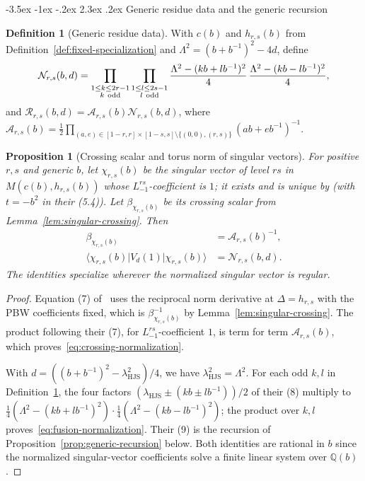 \documentclass[twoside,10pt]{article}
\makeatletter
\numberwithin{equation}{section}
\theoremstyle{slbody}
\newtheorem{proposition}[theorem]{Proposition}
\theoremstyle{definition}
\newtheorem{definition}[theorem]{Definition}
\theoremstyle{remark}
\renewcommand{\section}{%
  \@startsection{section}{1}{\z@}%
    {-3.5ex \@plus -1ex \@minus -.2ex}%
    {2.3ex \@plus .2ex}%
    {\normalfont\large\bfseries}}
\makeatother
\begin{document}
\section{Generic residue data and the generic recursion}\label{sec:generic-recursion}

\begin{definition}[Generic residue data]
\label{def:generic-residue}
With \(c(b)\) and \(h_{r,s}(b)\) from Definition~\ref{def:fixed-specialization}
and \(\Lambda^2=(b+b^{-1})^2-4d\), define
\[
 {\mathcal N}_{r,s}(b,d)
 =\prod_{\substack{1\leq k\leq2r-1\\k\ {\rm odd}}}
  \prod_{\substack{1\leq l\leq2s-1\\l\ {\rm odd}}}
 \frac{\Lambda^2-(kb+lb^{-1})^2}{4}\,
 \frac{\Lambda^2-(kb-lb^{-1})^2}{4},
\]
and \({\mathcal R}_{r,s}(b,d)={\mathcal A}_{r,s}(b){\mathcal N}_{r,s}(b,d)\),
where
\({\mathcal A}_{r,s}(b)=\frac12\prod_{(a,e)\in[1-r,r]\times[1-s,s]\setminus\{(0,0),(r,s)\}}(ab+eb^{-1})^{-1}\).
\end{definition}

\begin{proposition}[Crossing scalar and torus norm of singular vectors]
\label{prop:imported-normalizations}
For positive \(r,s\) and generic \(b\), let \(\chi_{r,s}(b)\) be the
singular vector of level \(rs\) in \(M(c(b),h_{r,s}(b))\) whose
\(L_{-1}^{rs}\)-coefficient is \(1\); it exists and is unique by
\cite[Propositions~5.1, 5.2 and Corollary~5.2]{IoharaKoga2011}
(with \(t=-b^2\) in their (5.4)).  Let
\(\beta_{\chi_{r,s}(b)}\) be its crossing scalar from
Lemma~\ref{lem:singular-crossing}.  Then
\begin{align}
 \beta_{\chi_{r,s}(b)}&={\mathcal A}_{r,s}(b)^{-1},\label{eq:crossing-normalization}\\
 \langle\chi_{r,s}(b)|V_d(1)|\chi_{r,s}(b)\rangle&={\mathcal N}_{r,s}(b,d).\label{eq:fusion-normalization}
\end{align}
The identities specialize wherever the normalized singular vector is regular.
\end{proposition}

\begin{proof}
Equation (7) of~\cite[\S3]{HadaszJaskolskiSuchanek2010} uses the reciprocal
norm derivative at \(\Delta=h_{r,s}\) with the PBW coefficients fixed,
which is \(\beta_{\chi_{r,s}(b)}^{-1}\) by Lemma~\ref{lem:singular-crossing}.
The product following their (7), for \(L_{-1}^{rs}\)-coefficient \(1\), is
term for term \({\mathcal A}_{r,s}(b)\), which proves~\eqref{eq:crossing-normalization}.

With \(d=((b+b^{-1})^2-\lambda_{\mathrm{HJS}}^2)/4\), we have
\(\lambda_{\mathrm{HJS}}^2=\Lambda^2\). For each odd \(k,l\) in
Definition~\ref{def:generic-residue}, the four factors
\((\lambda_{\mathrm{HJS}}\pm(kb\pm lb^{-1}))/2\) of their (8) multiply to
\(\frac14(\Lambda^2-(kb+lb^{-1})^2)\cdot\frac14(\Lambda^2-(kb-lb^{-1})^2)\); the
product over \(k,l\) proves~\eqref{eq:fusion-normalization}.  Their (9) is the
recursion of Proposition~\ref{prop:generic-recursion} below.
Both identities are rational in \(b\) since the normalized singular-vector
coefficients solve a finite linear system over \(\mathbb Q(b)\).
\end{proof}
\end{document}

